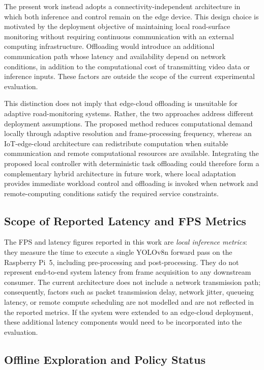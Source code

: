 \documentclass{ieeeaccess}
\begin{document}
The present work instead adopts a connectivity-independent architecture in
which both inference and control remain on the edge device. This design choice
is motivated by the deployment objective of maintaining local road-surface
monitoring without requiring continuous communication with an external
computing infrastructure. Offloading would introduce an additional
communication path whose latency and availability depend on network
conditions, in addition to the computational cost of transmitting video data
or inference inputs. These factors are outside the scope of the current
experimental evaluation.

This distinction does not imply that edge-cloud offloading is unsuitable for
adaptive road-monitoring systems. Rather, the two approaches address
different deployment assumptions. The proposed method reduces computational
demand locally through adaptive resolution and frame-processing frequency,
whereas an IoT-edge-cloud architecture can redistribute computation when
suitable communication and remote computational resources are available.
Integrating the proposed local controller with deterministic task offloading
could therefore form a complementary hybrid architecture in future work,
where local adaptation provides immediate workload control and offloading is
invoked when network and remote-computing conditions satisfy the required
service constraints.

\subsection{Scope of Reported Latency and FPS Metrics}

The FPS and latency figures reported in this work are \emph{local inference
metrics}: they measure the time to execute a single YOLOv8n forward pass on
the Raspberry Pi~5, including pre-processing and post-processing. They do
not represent end-to-end system latency from frame acquisition to any
downstream consumer. The current architecture does not include a network
transmission path; consequently, factors such as packet transmission delay,
network jitter, queueing latency, or remote compute scheduling are not
modelled and are not reflected in the reported metrics. If the system were
extended to an edge-cloud deployment, these additional latency components
would need to be incorporated into the evaluation.

\subsection{Offline Exploration and Policy Status}
\end{document}
